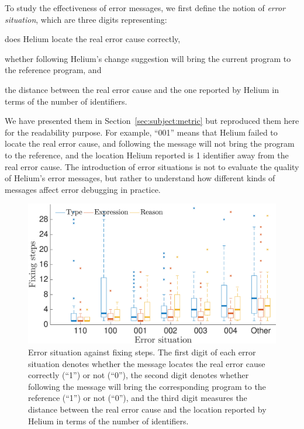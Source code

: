\documentclass[12pt]{report}	%
\begin{document}
\noindent
To study the effectiveness of error messages,
we first define the notion of \emph{error situation}, which are three
digits representing:
\begin{enumerate*}[label=(\alph*)]
\item does Helium locate the real error cause correctly,
\item whether following Helium's change suggestion will bring
the current program to the reference program, and
\item the distance between the real error cause and the one reported
by Helium in terms of the number of identifiers.
\end{enumerate*}
%
We have presented them in Section~\ref{sec:subject:metric} but reproduced them
here for the readability purpose.
For example, ``001'' means that Helium failed to locate the real error cause,
and following the message will not bring the program to the reference,
and the location Helium reported is 1 identifier away from the
real error cause.
%
The introduction of error situations is not to evaluate
the quality of Helium's error messages,
but rather to understand how different kinds of messages
affect error debugging in practice.


\begin{figure}
\centering
\includegraphics[width=0.85\columnwidth]{images/step_test.eps}
\caption[Error situation against fixing steps]{Error situation against fixing steps. The first digit
of each error situation denotes whether the message locates
the real error cause correctly (``1'') or not (``0''), the
second digit denotes whether following the message will bring
the corresponding program to the reference (``1'') or not (``0''), 
and the third digit measures the distance between the real error
cause and the location reported by Helium in terms of 
the number of identifiers.}
\label{fig:errsitu1}
\end{figure}
\end{document}
